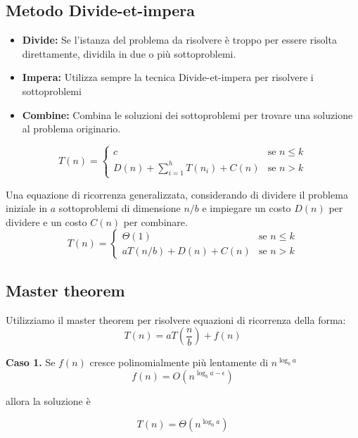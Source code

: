 \documentclass{article}
\begin{document}
\subsection{Metodo Divide-et-impera}

\begin{itemize}
    \item \textbf{Divide: } Se l'istanza del problema da risolvere è troppo  per essere risolta direttamente, dividila in due o più sottoproblemi.
    \item \textbf{Impera: } Utilizza sempre la tecnica Divide-et-impera per risolvere i sottoproblemi
    \item \textbf{Combine: } Combina le soluzioni dei sottoproblemi per trovare una soluzione al problema originario.
\end{itemize}

\begin{equation*}
    T(n) =
    \begin{cases}
        c                                   & \text{se } n \leq k \\
        D(n) + \sum_{i = 1}^h T(n_i) + C(n) & \text{se }n > k
    \end{cases}
\end{equation*}

Una equazione di ricorrenza generalizzata, considerando di dividere il problema iniziale in \(a\) sottoproblemi di dimensione \(n/b\) e impiegare un costo \(D(n)\) per dividere e un costo \(C(n)\) per combinare.
\begin{equation*}
    T(n) =
    \begin{cases}
        \Theta(1)             & \text{se } n \leq k \\
        aT(n/b) + D(n) + C(n) & \text{se }n > k
    \end{cases}
\end{equation*}

\subsection{Master theorem}
Utilizziamo il master theorem per risolvere equazioni di ricorrenza della forma:
\[T(n) = aT\left(\frac{n}{b}\right) + f(n)\]

\vspace{1cm}

\textbf{Caso 1.}
Se \(f(n)\) cresce polinomialmente più lentamente di \(n^{\log_b a}\)
\[f(n) = O\left(n^{\log_b a - \epsilon}\right)\]
\begin{center}allora la soluzione è\end{center}
\[T(n) = \Theta\left(n^{\log_b a}\right)\]
\end{document}
